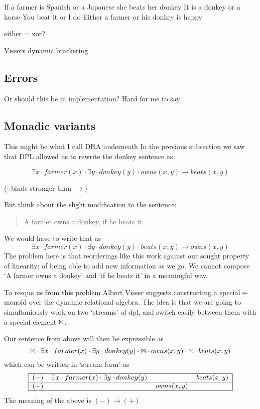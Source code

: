 \documentclass[12pt]{article}
\begin{document}
If a farmer is Spanish or a Japanese she beats her donkey
It is a donkey or a horse
You beat it or I do
Either a farmer or his donkey is happy

either = xor?

Vissers dynamic bracketing


\subsection{Errors}

Or should this be in implementation? Hard for me to say



\subsection{Monadic variants}
This might be what I call DRA underneath
In the previous subsection we saw that DPL allowed us to rewrite the donkey sentence as 

\begin{equation}
\exists x \cdot farmer(x) \cdot \exists y \cdot donkey(y) \cdot owns(x,y) \rightarrow beats(x,y)
\end{equation}

($\cdot$ binds stronger than $\rightarrow$)

But think about the slight modification to the sentence:
%
\begin{quotation}
A farmer owns a donkey, if he beats it
\end{quotation}
%
We would have to write that as
%
\begin{equation}
\exists x \cdot farmer(x) \cdot \exists y \cdot donkey(y) \cdot beats(x,y) \rightarrow owns(x,y)
\end{equation}
%
The problem here is that reorderings like this work against our sought property of linearity: of being able to add new information as we go. We cannot compose `A farmer owns a donkey' and `if he beats it' in a meaningful way.

To resque us from this problem Albert Visser suggests constructing a special e-monoid over the dynamic relational algebra. The idea is that we are going to simultaniously work on two `streams' of dpl, and switch easily between them with a special element $\Bowtie$.

Our sentence from above will then be expressible as
%
\begin{equation}
\Bowtie \cdot \exists x \cdot farmer(x) \cdot \exists y \cdot donkey(y) \cdot \Bowtie \cdot owns(x,y) \cdot \Bowtie \cdot beats(x,y)
\end{equation}
%
which can be written in `stream form' as
%
\begin{equation}
\begin{tabular}{|clll|}
    \hline
    $(-)$ & $\exists x \cdot farmer(x) \cdot \exists y \cdot donkey(y)$ & ~ & $beats(x,y)$ \\\hline
    $(+)$ & ~ & $owns(x,y)$ & ~ \\\hline
\end{tabular}
\end{equation}
%
The meaning of the above is $(-) \rightarrow (+)$
\end{document}
